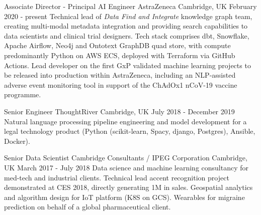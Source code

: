 

\begin{cventries}

  \cventry
    {Associate Director - Principal AI Engineer} %
    {AstraZeneca} %
    {Cambridge, UK} %
    {February 2020 - present} %
    {  
        Technical lead of \emph{Data Find and Integrate} knowledge graph team, creating multi-modal metadata integration and providing search capabilities to data scientists and clinical trial designers. Tech stack comprises dbt, Snowflake, Apache Airflow, Neo4j and Ontotext GraphDB quad store, with compute predominantly Python on AWS ECS, deployed with Terraform via GitHub Actions. Lead developer on the first GxP validated machine learning projects to be released into production within AstraZeneca, including an NLP-assisted adverse event monitoring tool in support of the ChAdOx1 nCoV-19 vaccine programme.
    }

  \cventry
    {Senior Engineer} %
    {ThoughtRiver} %
    {Cambridge, UK} %
    {July 2018 - December 2019} %
    {  
    Natural language processing pipeline engineering and model development for a legal technology product (Python (scikit-learn, Spacy, django, Postgres), Ansible, Docker).
    }

  \cventry
    {Senior Data Scientist} %
    {Cambridge Consultants / IPEG Corporation} %
    {Cambridge, UK} %
    {March 2017 - July 2018} %
    {  
    Data science and machine learning consultancy for med-tech and industrial clients. Technical lead accent recognition project demonstrated at CES 2018, directly generating 1M in sales. Geospatial analytics and algorithm design for IoT platform (K8S on GCS). Wearables for migraine prediction on behalf of a global pharmaceutical client.
    \vspace{.1cm}
    }


\end{cventries}
